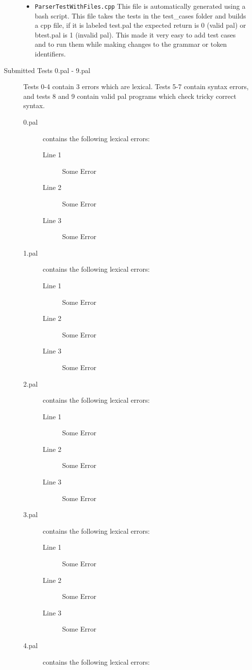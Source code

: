 \documentclass{article}
\begin{document}
\begin{description}
\begin{itemize}
		\item \texttt{ParserTestWithFiles.cpp} This file is automatically
		generated using a bash script. This file takes the tests in
		the test\_cases folder and builds a cpp file, if it is labeled test\*.pal
		the expected return is 0 (valid pal) or btest\*.pal is 1 (invalid pal).
		This made it very easy to add test cases and to run them while making 
		changes to the grammar or token identifiers.
	\end{itemize}
\item[Submitted Tests 0.pal - 9.pal]
	Tests 0-4 contain 3 errors which are lexical. Tests 5-7 contain
	syntax errors, and tests 8 and 9 contain valid pal programs which 
	check tricky correct syntax.
		\begin{description}
		\item[0.pal] contains the following lexical errors:
			\begin{description}
		  	   \item[Line 1] Some Error
		  	   \item[Line 2] Some Error
		 	   \item[Line 3] Some Error
			\end{description}
		\item[1.pal] contains the following lexical errors:
			\begin{description}
		  	   \item[Line 1] Some Error
		  	   \item[Line 2] Some Error
		 	   \item[Line 3] Some Error
			\end{description}
		\item[2.pal] contains the following lexical errors:
			\begin{description}
		  	   \item[Line 1] Some Error
		  	   \item[Line 2] Some Error
		 	   \item[Line 3] Some Error
			\end{description}
		\item[3.pal] contains the following lexical errors:
			\begin{description}
		  	   \item[Line 1] Some Error
		  	   \item[Line 2] Some Error
		 	   \item[Line 3] Some Error
			\end{description}
		\item[4.pal] contains the following lexical errors:

\end{description}
\end{description}
\end{document}
